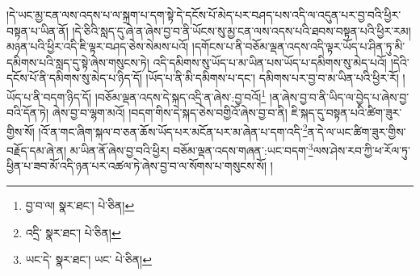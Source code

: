 །དེ་ཡང་མྱ་ངན་ལས་འདས་པ་ལ་སྐྲག་པ་དག་སྟེ་དེ་དངོས་པོ་མེད་པར་བཤད་པས་འདི་ལ་འདུན་པར་བྱ་བའི་ཕྱིར་བསྟན་པ་ཡིན་ནོ། །དེ་ཅིའི་སླད་དུ་ཞེ་ན་ཞེས་བྱ་བ་ནི་ཡོངས་སུ་མྱ་ངན་ལས་འདས་པའི་ཐབས་བསྟན་པའི་ཕྱིར་རམ། མཉན་པའི་ཕྱིར་འདི་ཇི་ལྟར་བཤད་ཅེས་སེམས་པའོ། །དགོངས་པ་ནི་བཅོམ་ལྡན་འདས་འདི་ལྟར་ཡོད་པ་ཤིན་ཏུ་མི་དམིགས་པའི་སླད་དུ་སྟེ་ཞེས་གསུངས་ཏེ། འདི་དམིགས་སུ་ཡོད་པ་མ་ཡིན་པས་ཡོད་པ་དམིགས་སུ་མེད་པའོ། །དེའི་དངོས་པོ་ནི་དམིགས་སུ་མེད་པ་ཉིད་དོ། །ཡོད་པ་ནི་མི་དམིགས་པ་དང་། དམིགས་པར་བྱ་བ་མ་ཡིན་པའི་ཕྱིར་རོ། །ཡོད་པ་ནི་བདག་ཉིད་དོ། །བཅོམ་ལྡན་འདས་དེ་སྐད་འདྲི་ན་ཞེས་:བྱ་བའོ།\footnote{བྱ་བ་ལ།  སྣར་ཐང་།  པེ་ཅིན། } །ན་ཞེས་བྱ་བ་ནི་ཡིད་ལ་བྱེད་པ་ཞེས་བྱ་བའི་དོན་ཏེ། ཞེས་བྱ་བ་ལྷག་མའོ། །བདག་གིས་དེ་སྐད་ཅེས་བགྱིའོ་ཞེས་བྱ་བ་ནི། ཇི་སྐད་དུ་བསྟན་པའི་ཚིག་ཟུར་གྱིས་སོ། །འོ་ན་གང་ཞིག་སྐལ་བ་ཅན་ཆོས་ཡོད་པར་མངོན་པར་མ་ཞེན་པ་དག་འདི་\footnote{འདྲི་  སྣར་ཐང་།  པེ་ཅིན། }ན་དེ་ལ་ཡང་ཚིག་ཟུར་གྱིས་བརྗོད་དམ་ཞེ་ན། མ་ཡིན་ནོ་ཞེས་བྱ་བའི་ཕྱིར། བཅོམ་ལྡན་འདས་གཞན་:ཡང་བདག་\footnote{ཡང་དེ་  སྣར་ཐང་། ཡང་  པེ་ཅིན། }ལས་ཤེས་རབ་ཀྱི་ཕ་རོལ་ཏུ་ཕྱིན་པ་ཟབ་མོ་འདི་ཉན་པར་འཚལ་ཏེ་ཞེས་བྱ་བ་ལ་སོགས་པ་གསུངས་སོ། །
